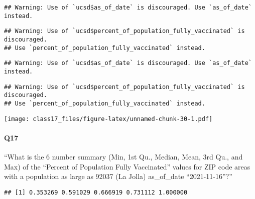\documentclass[
]{article}
\newenvironment{Shaded}{\begin{snugshade}}{\end{snugshade}}
\newcommand{\CommentTok}[1]{\textcolor[rgb]{0.56,0.35,0.01}{\textit{#1}}}
\newcommand{\FloatTok}[1]{\textcolor[rgb]{0.00,0.00,0.81}{#1}}
\newcommand{\FunctionTok}[1]{\textcolor[rgb]{0.00,0.00,0.00}{#1}}
\newcommand{\NormalTok}[1]{#1}
\newcommand{\SpecialCharTok}[1]{\textcolor[rgb]{0.00,0.00,0.00}{#1}}
\begin{document}
\begin{verbatim}
## Warning: Use of `ucsd$as_of_date` is discouraged. Use `as_of_date` instead.
\end{verbatim}

\begin{verbatim}
## Warning: Use of `ucsd$percent_of_population_fully_vaccinated` is discouraged.
## Use `percent_of_population_fully_vaccinated` instead.
\end{verbatim}

\begin{verbatim}
## Warning: Use of `ucsd$as_of_date` is discouraged. Use `as_of_date` instead.
\end{verbatim}

\begin{verbatim}
## Warning: Use of `ucsd$percent_of_population_fully_vaccinated` is discouraged.
## Use `percent_of_population_fully_vaccinated` instead.
\end{verbatim}

\texttt{[image: class17\_files/figure-latex/unnamed-chunk-30-1.pdf]}

\hypertarget{q17}{%
\paragraph{Q17}\label{q17}}

``What is the 6 number summary (Min, 1st Qu., Median, Mean, 3rd Qu., and
Max) of the ``Percent of Population Fully Vaccinated'' values for ZIP
code areas with a population as large as 92037 (La Jolla) as\_of\_date
``2021-11-16''?''

\begin{Shaded}
\end{Shaded}

\begin{verbatim}
## [1] 0.353269 0.591029 0.666919 0.731112 1.000000
\end{verbatim}

\begin{Shaded}
\end{Shaded}
\end{document}

